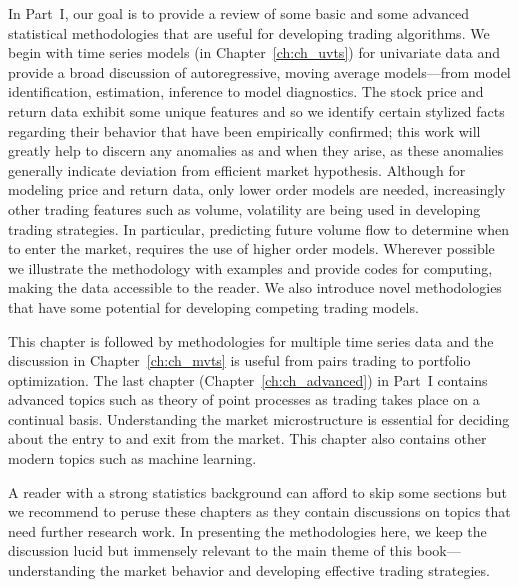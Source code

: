 
In Part~I, our goal is to provide a review of some basic and some advanced statistical methodologies that are useful for developing trading algorithms. We begin with time series models (in Chapter~\ref{ch:ch_uvts}) for univariate data and provide a broad discussion of autoregressive, moving average models---from model identification, estimation, inference to model diagnostics. The stock price and return data exhibit some unique features and so we identify certain stylized facts regarding their behavior that have been empirically confirmed; this work will greatly help to discern any anomalies as and when they arise, as these anomalies generally indicate deviation from efficient market hypothesis. Although for modeling price and return data, only lower order models are needed, increasingly other trading features such as volume, volatility are being used in developing trading strategies. In particular,  predicting future volume flow to determine when to enter the market, requires the use of higher order models. Wherever possible we illustrate the methodology with examples and provide codes for computing, making the data accessible to the reader. We also introduce novel methodologies that have some potential for developing competing trading models.


This chapter is followed by methodologies for multiple time series data and the discussion in Chapter~\ref{ch:ch_mvts} is useful from pairs trading to portfolio optimization. The last chapter (Chapter~\ref{ch:ch_advanced}) in Part~I contains advanced topics such as theory of point processes as trading takes place on a continual basis. Understanding the market microstructure is essential for deciding about the entry to and exit from the market. This chapter also contains other modern topics such as machine learning.


A reader with a strong statistics background can afford to skip some sections but we recommend to peruse these chapters as they contain discussions on topics that need further research work. In presenting the methodologies here, we keep the discussion lucid but immensely relevant to the main theme of this book---understanding the market behavior and developing effective trading strategies. 